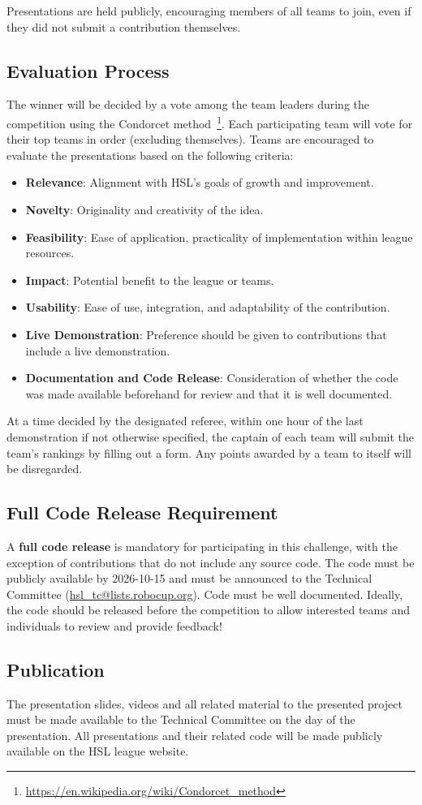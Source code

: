 Presentations are held publicly, encouraging members of all teams to join, even if they did not submit a contribution themselves.

\subsection{Evaluation Process}
The winner will be decided by a vote among the team leaders during the competition using the Condorcet method~\footnote{\url{https://en.wikipedia.org/wiki/Condorcet_method}}. Each participating team will vote for their top teams in order (excluding themselves). Teams are encouraged to evaluate the presentations based on the following criteria:

\begin{itemize}
\item \textbf{Relevance}: Alignment with HSL’s goals of growth and improvement.
\item \textbf{Novelty}: Originality and creativity of the idea.
\item \textbf{Feasibility}: Ease of application, practicality of implementation within league resources.
\item \textbf{Impact}: Potential benefit to the league or teams.
\item \textbf{Usability}: Ease of use, integration, and adaptability of the contribution.
\item \textbf{Live Demonstration}: Preference should be given to contributions that include a live demonstration.
\item \textbf{Documentation and Code Release}: Consideration of whether the code was made available beforehand for review and that it is well documented.
\end{itemize}

At a time decided by the designated referee, within one hour of the last demonstration if not otherwise specified, the captain of each team will submit the team’s rankings by filling out a form. Any points awarded by a team to itself will be disregarded.

\subsection{Full Code Release Requirement}
A \textbf{full code release} is mandatory for participating in this challenge, with the exception of contributions that do not include any source code. The code must be publicly available by 2026-10-15
and must be announced to the Technical Committee (\url{hsl_tc@lists.robocup.org}). Code must be well documented.
Ideally, the code should be released before the competition to allow interested teams and individuals to review and provide feedback!

\subsection{Publication}
The presentation slides, videos and all related material to the presented project must be made available to the Technical Committee on the day of the presentation. 
All presentations and their related code will be made publicly available on the HSL league website.